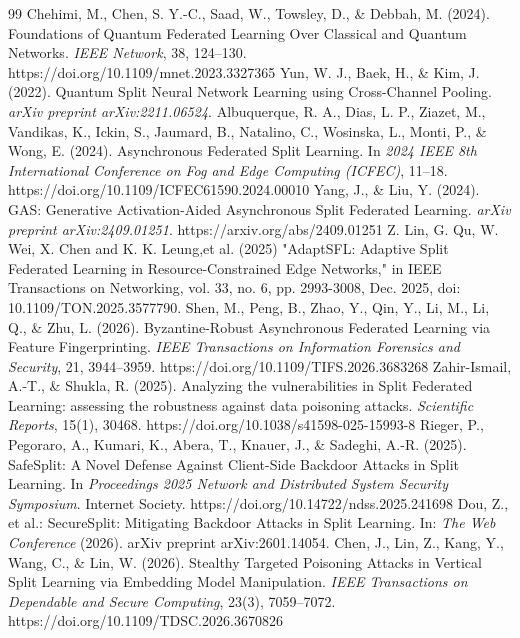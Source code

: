 \documentclass[pdflatex,sn-mathphys-num]{sn-jnl}
\begin{document}
\begin{thebibliography}{99}
Chehimi, M., Chen, S. Y.-C., Saad, W., Towsley, D., \& Debbah, M. (2024). Foundations of Quantum Federated Learning Over Classical and Quantum Networks. \textit{IEEE Network}, 38, 124--130. https://doi.org/10.1109/mnet.2023.3327365
Yun, W. J., Baek, H., \& Kim, J. (2022). Quantum Split Neural Network Learning using Cross-Channel Pooling. \textit{arXiv preprint arXiv:2211.06524}.
Albuquerque, R. A., Dias, L. P., Ziazet, M., Vandikas, K., Ickin, S., Jaumard, B., Natalino, C., Wosinska, L., Monti, P., \& Wong, E. (2024). Asynchronous Federated Split Learning. In \textit{2024 IEEE 8th International Conference on Fog and Edge Computing (ICFEC)}, 11--18. https://doi.org/10.1109/ICFEC61590.2024.00010
Yang, J., \& Liu, Y. (2024). GAS: Generative Activation-Aided Asynchronous Split Federated Learning. \textit{arXiv preprint arXiv:2409.01251}. https://arxiv.org/abs/2409.01251
Z. Lin, G. Qu, W. Wei, X. Chen and K. K. Leung,et al. (2025) "AdaptSFL: Adaptive Split Federated Learning in Resource-Constrained Edge Networks," in IEEE Transactions on Networking, vol. 33, no. 6, pp. 2993-3008, Dec. 2025, doi: 10.1109/TON.2025.3577790.
Shen, M., Peng, B., Zhao, Y., Qin, Y., Li, M., Li, Q., \& Zhu, L. (2026). Byzantine-Robust Asynchronous Federated Learning via Feature Fingerprinting. \textit{IEEE Transactions on Information Forensics and Security}, 21, 3944--3959. https://doi.org/10.1109/TIFS.2026.3683268
Zahir-Ismail, A.-T., \& Shukla, R. (2025). Analyzing the vulnerabilities in Split Federated Learning: assessing the robustness against data poisoning attacks. \textit{Scientific Reports}, 15(1), 30468. https://doi.org/10.1038/s41598-025-15993-8
Rieger, P., Pegoraro, A., Kumari, K., Abera, T., Knauer, J., \& Sadeghi, A.-R. (2025). SafeSplit: A Novel Defense Against Client-Side Backdoor Attacks in Split Learning. In \textit{Proceedings 2025 Network and Distributed System Security Symposium}. Internet Society. https://doi.org/10.14722/ndss.2025.241698
Dou, Z., et al.: SecureSplit: Mitigating Backdoor Attacks in Split Learning. In: \textit{The Web Conference} (2026). arXiv preprint arXiv:2601.14054.
Chen, J., Lin, Z., Kang, Y., Wang, C., \& Lin, W. (2026). Stealthy Targeted Poisoning Attacks in Vertical Split Learning via Embedding Model Manipulation. \textit{IEEE Transactions on Dependable and Secure Computing}, 23(3), 7059--7072. https://doi.org/10.1109/TDSC.2026.3670826

\end{thebibliography}
\end{document}
